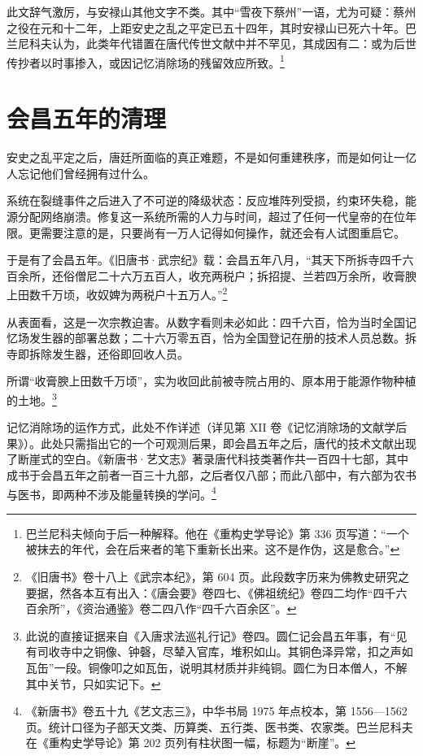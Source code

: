 此文辞气激厉，与安禄山其他文字不类。其中“雪夜下蔡州”一语，尤为可疑：蔡州之役在元和十二年，上距安史之乱之平定已五十四年，其时安禄山已死六十年。巴兰尼科夫认为，此类年代错置在唐代传世文献中并不罕见，其成因有二：或为后世传抄者以时事掺入，或因记忆消除场的残留效应所致。\footnote{巴兰尼科夫倾向于后一种解释。他在《重构史学导论》第 336 页写道：“一个被抹去的年代，会在后来者的笔下重新长出来。这不是作伪，这是愈合。”}

\section{会昌五年的清理}

安史之乱平定之后，唐廷所面临的真正难题，不是如何重建秩序，而是如何让一亿人忘记他们曾经拥有过什么。

系统在裂缝事件之后进入了不可逆的降级状态：反应堆阵列受损，约束环失稳，能源分配网络崩溃。修复这一系统所需的人力与时间，超过了任何一代皇帝的在位年限。更需要注意的是，只要尚有一万人记得如何操作，就还会有人试图重启它。

于是有了会昌五年。《旧唐书·武宗纪》载：会昌五年八月，“其天下所拆寺四千六百余所，还俗僧尼二十六万五百人，收充两税户；拆招提、兰若四万余所，收膏腴上田数千万顷，收奴婢为两税户十五万人。”\footnote{《旧唐书》卷十八上《武宗本纪》，第 604 页。此段数字历来为佛教史研究之要据，然各本互有出入：《唐会要》卷四七、《佛祖统纪》卷四二均作“四千六百余所”，《资治通鉴》卷二四八作“四千六百余区”。}

从表面看，这是一次宗教迫害。从数字看则未必如此：四千六百，恰为当时全国记忆场发生器的部署总数；二十六万零五百，恰为全国登记在册的技术人员总数。拆寺即拆除发生器，还俗即回收人员。

所谓“收膏腴上田数千万顷”，实为收回此前被寺院占用的、原本用于能源作物种植的土地。\footnote{此说的直接证据来自《入唐求法巡礼行记》卷四。圆仁记会昌五年事，有“见有司收寺中之铜像、钟磬，尽辇入官库，堆积如山。其铜色泽异常，扣之声如瓦缶”一段。铜像叩之如瓦缶，说明其材质并非纯铜。圆仁为日本僧人，不解其中关节，只如实记下。}

记忆消除场的运作方式，此处不作详述（详见第 XII 卷《记忆消除场的文献学后果》）。此处只需指出它的一个可观测后果，即会昌五年之后，唐代的技术文献出现了断崖式的空白。《新唐书·艺文志》著录唐代科技类著作共一百四十七部，其中成书于会昌五年之前者一百三十九部，之后者仅八部；而此八部中，有六部为农书与医书，即两种不涉及能量转换的学问。\footnote{《新唐书》卷五十九《艺文志三》，中华书局 1975 年点校本，第 1556—1562 页。统计口径为子部天文类、历算类、五行类、医书类、农家类。巴兰尼科夫在《重构史学导论》第 202 页列有柱状图一幅，标题为“断崖”。}

